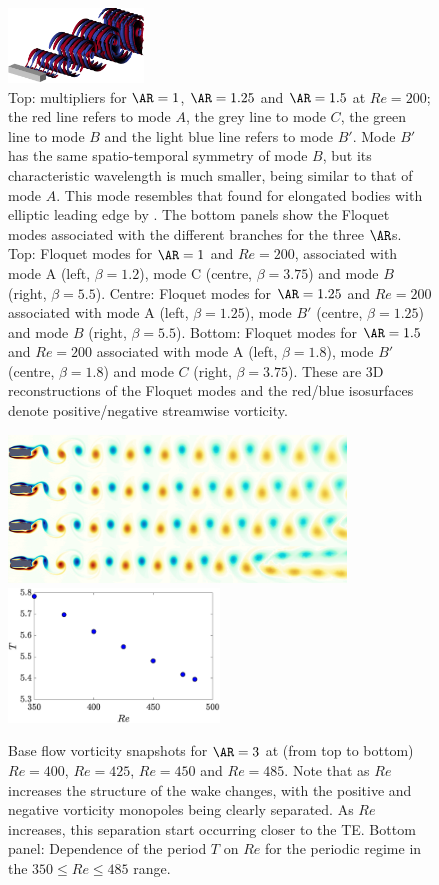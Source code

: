 \documentclass{jfm}
\begin{document}
\begin{figure}
  \includegraphics[width=0.32\textwidth]{./fig/AR1s/Floqetmode_beta_3p75_Re200_AR1p5_C.png}
  \caption{Top: multipliers for $\AR=1$, $\AR=1.25$ and $\AR=1.5$ at $Re=200$; the red line refers to mode $A$, the grey line to mode $C$, the green line to mode $B$ and the light blue line refers to mode $B'$. Mode $B'$ has the same spatio-temporal symmetry of mode $B$, but its characteristic wavelength is much smaller, being similar to that of mode $A$. This mode resembles that found for elongated bodies with elliptic leading edge by \cite{ryan-etal-2005}. The bottom panels show the Floquet modes associated with the different branches for the three $\AR$s. Top: Floquet modes for $\AR=1$ and $Re=200$, associated with mode A (left, $\beta=1.2$), mode C (centre, $\beta=3.75$) and mode $B$ (right, $\beta=5.5$). Centre: Floquet modes for $\AR=1.25$ and $Re=200$ associated with mode A (left, $\beta=1.25$), mode $B'$ (centre, $\beta = 1.25$) and mode $B$ (right, $\beta=5.5$). Bottom: Floquet modes for $\AR=1.5$ and $Re=200$ associated with mode A (left, $\beta=1.8$), mode $B'$ (centre, $\beta=1.8$) and mode $C$ (right, $\beta=3.75$). These are 3D reconstructions of the Floquet modes and the red/blue isosurfaces denote positive/negative streamwise vorticity.}
  \label{fig:xx}
\end{figure}


\begin{figure}
  \centering
  \includegraphics[width=0.8\textwidth]{./fig/AR3/BF_vort_Re400_475.png}
  \includegraphics[width=0.5\textwidth]{./fig/AR3/T_Re.eps}
  \caption{Base flow vorticity snapshots for $\AR=3$ at (from top to bottom) $Re=400$, $Re=425$, $Re=450$ and $Re=485$. Note that as $Re$ increases the structure of the wake changes, with the positive and negative vorticity monopoles being clearly separated. As $Re$ increases, this separation start occurring closer to the TE. Bottom panel: Dependence of the period $T$ on $Re$ for the periodic regime in the $350 \le Re \le 485$ range.}
  \label{fig:BF_AR3}
\end{figure}
\end{document}
